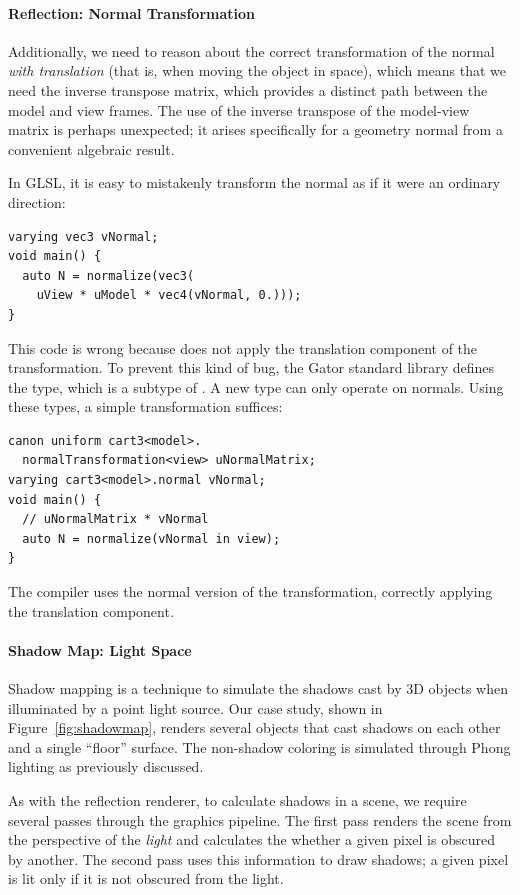 {\paragraph{Reflection: Normal Transformation}
Additionally, we need to reason about the correct transformation of the normal \emph{with translation} (that is, when moving the object in space), which means that we need the inverse transpose matrix, which provides a distinct path between the model and view frames.  The use of the inverse transpose of the model-view matrix is perhaps unexpected; it arises specifically for a geometry normal from a convenient algebraic result.

In GLSL, it is easy to mistakenly transform the normal as if it were an ordinary direction:
%
\begin{lstlisting}
varying vec3 vNormal;
void main() {
  auto N = normalize(vec3(
    uView * uModel * vec4(vNormal, 0.)));
}
\end{lstlisting}
%
This code is wrong because  does not apply the translation component of the  transformation.
To prevent this kind of bug, the Gator standard library defines the  type, which is a subtype of .
A new  type can only operate on normals.
Using these types, a simple  transformation suffices:
%
\begin{lstlisting}
canon uniform cart3<model>.
  normalTransformation<view> uNormalMatrix;
varying cart3<model>.normal vNormal;
void main() {
  // uNormalMatrix * vNormal
  auto N = normalize(vNormal in view);  
}
\end{lstlisting}
%
The compiler uses the normal version of the transformation, correctly applying the translation component.

\paragraph{Shadow Map: Light Space}
Shadow mapping is a technique to simulate the shadows cast by 3D objects when illuminated by a point light source.  Our case study, shown in Figure~\ref{fig:shadowmap}, renders several objects that cast shadows on each other and a single ``floor'' surface.  The non-shadow coloring is simulated through Phong lighting as previously discussed.

As with the reflection renderer, to calculate shadows in a scene, we require several passes through the graphics pipeline.  The first pass renders the scene from the perspective of the \emph{light} and calculates the whether a given pixel is obscured by another.  The second pass uses this information to draw shadows; a given pixel is lit only if it is not obscured from the light.

}
